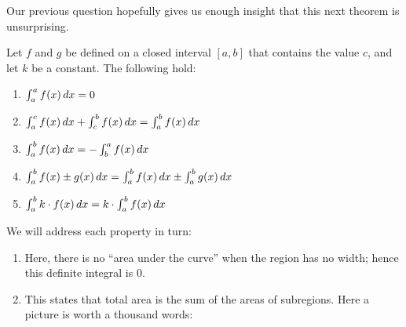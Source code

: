 \documentclass{ximera}
\begin{document}
\begin{question}
\begin{hint}
\begin{image}
\end{image}
\end{hint}
\end{question}


Our previous question hopefully gives us enough insight that this next
theorem is unsurprising.

\begin{theorem}
Let $f$ and $g$ be defined on a closed interval $[a,b]$ that contains the
value $c$, and let $k$ be a constant. The following
hold:
\begin{enumerate}
\item $\int_a^a f(x)\mathop{}\!d x = 0$
\item $\int_a^c f(x)\mathop{}\!d x + \int_c^b f(x)\mathop{}\!d x = \int_a^b f(x)\mathop{}\!d x$
\item $\int_a^bf(x)\mathop{}\!d x = -\int_b^a f(x)\mathop{}\!d x$
\item $\int_a^b f(x)\pm g(x)\mathop{}\!d x = \int_a^bf(x)\mathop{}\!d x \pm \int_a^bg(x)\mathop{}\!d x$
\item $\int_a^bk\cdot f(x)\mathop{}\!d x = k\cdot\int_a^bf(x)\mathop{}\!d x$
\end{enumerate}
\begin{explanation}
  We will address each property in turn:
\begin{enumerate}
\item Here, there is no ``area under the curve'' when the region has
  no width; hence this definite integral is $0$.
\item This states that total area is the sum of the areas of
  subregions. Here a picture is worth a thousand words:
  \begin{image}
\end{image}
\end{enumerate}
\end{explanation}
\end{theorem}
\end{document}
